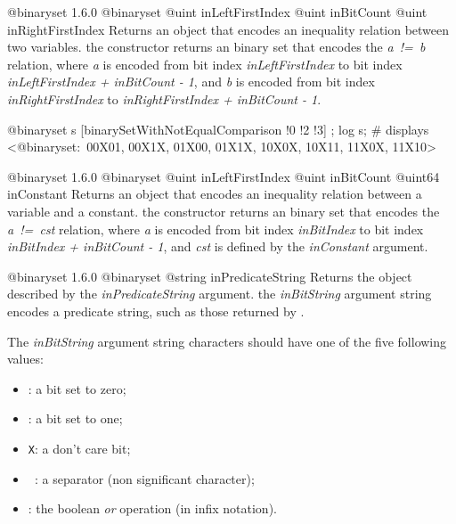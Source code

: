 {@binaryset}
{1.6.0}
{@binaryset}
{@uint inLeftFirstIndex}
{@uint inBitCount}
{@uint inRightFirstIndex}
{Returns an  object that encodes an inequality relation between two variables.}
{the constructor returns an binary set that encodes the \emph{a~!=~b} relation, where \emph{a} is encoded from bit index \emph{inLeftFirstIndex} to bit index \emph{inLeftFirstIndex  + inBitCount - 1}, and \emph{b} is encoded from bit index \emph{inRightFirstIndex} to \emph{inRightFirstIndex + inBitCount - 1}.}

\exempleDeuxLignes
{}
{@binaryset s [binarySetWithNotEqualComparison !0 !2 !3] ;}
{log s; \# displays <@binaryset:~00X01, 00X1X, 01X00, 01X1X, 10X0X, 10X11, 11X0X, 11X10>}





{@binaryset}
{1.6.0}
{@binaryset}
{@uint inLeftFirstIndex}
{@uint inBitCount}
{@uint64 inConstant}
{Returns an  object that encodes an inequality relation between a variable and a constant.}
{the constructor returns an binary set that encodes the \emph{a~!=~cst} relation, where \emph {a} is encoded from bit index \emph{inBitIndex} to bit index \emph{inBitIndex  + inBitCount - 1}, and \emph{cst} is defined by the \emph{inConstant} argument.}







{@binaryset}
{1.6.0}
{@binaryset}
{@string inPredicateString}
{Returns the  object described by the \emph{inPredicateString} argument.}
{the \emph{inBitString} argument string encodes a predicate string, such as those returned by .}
\begin{description}
\item The \emph{inBitString} argument string characters should have one of the five following values:
\begin{itemize}
\item \texttt{\textquotesingle}: a bit set to zero;
\item \texttt{\textquotesingle}: a bit set to one;
\item \texttt{\textquotesingle X\textquotesingle}: a don't care bit;
\item \texttt{\textquotesingle~\textquotesingle}: a separator (non significant character);
\item \texttt{\textquotesingle\textbar\textquotesingle}: the boolean \emph{or} operation (in infix notation).
\end{itemize}
\end{description}


